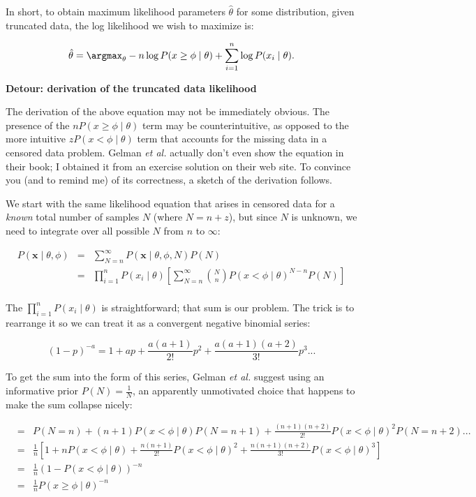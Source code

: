 In short, to obtain maximum likelihood parameters $\hat{\theta}$ for
some distribution, given truncated data, the log likelihood we wish to
maximize is:

\begin{equation}
  \hat{\theta} = \argmax_\theta -n \log P(x \geq \phi \mid \theta) 
                   + \sum_{i=1}^n \log P(x_i \mid \theta).
\label{eqn:truncated_objective}
\end{equation}

\textbf{Detour: derivation of the truncated data likelihood}

The derivation of the above equation may not be immediately obvious.
The presence of the $n P(x \geq \phi \mid \theta)$ term may be
counterintuitive, as opposed to the more intuitive $z P(x < \phi \mid
\theta)$ term that accounts for the missing data in a censored data
problem. Gelman \emph{et al.} actually don't even show the equation in
their book; I obtained it from an exercise solution on their web site.
To convince you (and to remind me) of its correctness, a sketch of the
derivation follows.

We start with the same likelihood equation that arises in censored
data for a \emph{known} total number of samples $N$ (where $N=n+z$),
but since $N$ is unknown, we need to integrate over all possible $N$
from $n$ to $\infty$:

\begin{eqnarray*}
   P(\mathbf{x} \mid \theta, \phi) & = &
    \sum_{N=n}^{\infty}   P(\mathbf{x} \mid \theta, \phi, N) P(N)\\
   & = & 
    \prod_{i=1}^n P(x_i \mid \theta) 
    \left[
      \sum_{N=n}^\infty {N \choose n} P(x < \phi \mid \theta)^{N-n} P(N)
    \right]\\
\end{eqnarray*}

The $\prod_{i=1}^n P(x_i \mid \theta)$ is straightforward; that sum is
our problem. The trick is to rearrange it so we can treat it as a
convergent negative binomial series:

\[
   (1-p)^{-a} = 1 + ap + \frac{a(a+1)}{2!} p^2 +
   \frac{a(a+1)(a+2)}{3!} p^3...
\]

To get the sum into the form of this series, Gelman \emph{et al.}
suggest using an informative prior $P(N) = \frac{1}{N}$, an apparently
unmotivated choice that happens to make the sum collapse nicely:

\begin{eqnarray*}
 &=& P(N=n) 
    + (n+1) P(x < \phi \mid \theta) P(N=n+1) 
    + \frac{(n+1)(n+2)}{2!} P(x < \phi \mid \theta)^2 P(N=n+2) ...\\
 &= & \frac{1}{n} \left[
      1 
      + n P(x < \phi \mid \theta)
      + \frac{n(n+1)}{2!} P(x < \phi \mid \theta)^2 
      + \frac{n(n+1)(n+2)}{3!} P(x < \phi \mid \theta)^3 \right]\\
 &=& \frac{1}{n} (1 - P(x < \phi \mid \theta))^{-n}\\
 &=& \frac{1}{n} P(x \geq \phi \mid \theta)^{-n}\\
\end{eqnarray*}


